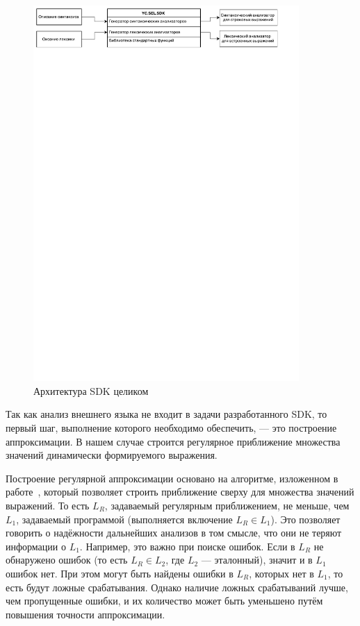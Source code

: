 \begin{figure}[h!]
\begin{center}
\includegraphics[width=0.9\textwidth]{pics/HighLevelArch}
\caption{Архитектура SDK целиком}
\label{fig:SDKHLArch} 
\end{center}
\end{figure}

Так как анализ внешнего языка не входит в задачи разработанного SDK, то первый шаг, выполнение которого необходимо обеспечить, --- это построение аппроксимации. В нашем случае строится регулярное приближение множества значений динамически формируемого выражения.

Построение регулярной аппроксимации основано на алгоритме, изложенном в работе~\cite{RegOverApprox}, который позволяет строить приближение сверху для множества значений выражений. То есть $L_R$, задаваемый регулярным приближением, не меньше, чем $L_1$, задаваемый программой (выполняется включение $L_R \in L_1$). Это позволяет говорить о надёжности дальнейших анализов в том смысле, что они не теряют информации о $L_1$. Например, это важно при поиске ошибок. Если в $L_R$ не обнаружено ошибок (то есть $L_R \in L_2$, где $L_2$ --- эталонный), значит и в $L_1$ ошибок нет. При этом могут быть найдены ошибки в $L_R$, которых нет в $L_1$, то есть будут ложные срабатывания. Однако наличие ложных срабатываний лучше, чем пропущенные ошибки, и их количество может быть уменьшено путём повышения точности аппроксимации. 

